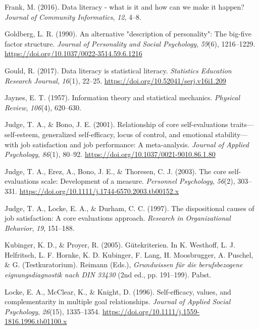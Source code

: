 \documentclass[
  12pt,
  a4paper,
  twoside]{article}
\newlength{\cslhangindent}
\newlength{\cslentryspacingunit} %
\newenvironment{CSLReferences}[2] %
 {%
  \setlength{\parindent}{0pt}
  \ifodd #1
  \let\oldpar\par
  \def\par{\hangindent=\cslhangindent\oldpar}
  \fi
  \setlength{\parskip}{#2\cslentryspacingunit}
 }%
 {}
\begin{document}
\begin{CSLReferences}{1}{0}
\leavevmode{}%
Frank, M. (2016). Data literacy - what is it and how can we make it happen? \emph{Journal of Community Informatics}, \emph{12}, 4--8.

\leavevmode{}%
Goldberg, L. R. (1990). An alternative "description of personality": The big-five factor structure. \emph{Journal of Personality and Social Psychology}, \emph{59}(6), 1216--1229. \url{https://doi.org/10.1037/0022-3514.59.6.1216}

\leavevmode{}%
Gould, R. (2017). Data literacy is statistical literacy. \emph{Statistics Education Research Journal}, \emph{16}(1), 22--25. \url{https://doi.org/10.52041/serj.v16i1.209}

\leavevmode{}%
Jaynes, E. T. (1957). Information theory and statistical mechanics. \emph{Physical Review}, \emph{106}(4), 620--630.

\leavevmode{}%
Judge, T. A., \& Bono, J. E. (2001). Relationship of core self-evaluations traits---self-esteem, generalized self-efficacy, locus of control, and emotional stability---with job satisfaction and job performance: A meta-analysis. \emph{Journal of Applied Psychology}, \emph{86}(1), 80--92. \url{https://doi.org/10.1037/0021-9010.86.1.80}

\leavevmode{}%
Judge, T. A., Erez, A., Bono, J. E., \& Thoresen, C. J. (2003). The core self-evaluations scale: Development of a measure. \emph{Personnel Psychology}, \emph{56}(2), 303--331. \url{https://doi.org/10.1111/j.1744-6570.2003.tb00152.x}

\leavevmode{}%
Judge, T. A., Locke, E. A., \& Durham, C. C. (1997). The dispositional causes of job satisfaction: A core evaluations approach. \emph{Research in Organizational Behavior}, \emph{19}, 151--188.

\leavevmode{}%
Kubinger, K. D., \& Proyer, R. (2005). Gütekriterien. In K. Westhoff, L. J. Helfritsch, L. F. Hornke, K. D. Kubinger, F. Lang, H. Moosbrugger, A. Puschel, \& G. (Testkuratorium). Reimann (Eds.), \emph{Grundwissen für die berufsbezogene eignungsdiagnostik nach DIN 33430} (2nd ed., pp. 191--199). Pabst.

\leavevmode{}%
Locke, E. A., McClear, K., \& Knight, D. (1996). Self-efficacy, values, and complementarity in multiple goal relationships. \emph{Journal of Applied Social Psychology}, \emph{26}(15), 1335--1354. \url{https://doi.org/10.1111/j.1559-1816.1996.tb01100.x}


\end{CSLReferences}
\end{document}
